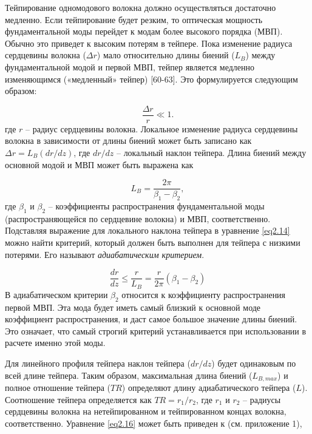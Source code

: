 Тейпирование одномодового волокна должно осуществляться достаточно медленно. Если тейпирование будет резким, то оптическая мощность фундаментальной моды перейдет к модам более высокого порядка (МВП). Обычно это приведет к высоким потерям в тейпере. Пока изменение радиуса сердцевины волокна ($\Delta r$) мало относительно длины биений ($L_B$) между фундаментальной модой и первой МВП, тейпер является медленно изменяющимся («медленный» тейпер) [60-63]. Это формулируется следующим образом:

\begin{equation}\label{eq2.14}
  \frac{\Delta r}{r} \ll 1.
\end{equation}
где $r$ -- радиус сердцевины волокна. Локальное изменение радиуса сердцевины волокна в зависимости от длины биений может быть записано как $\Delta r=L_B (dr/dz)$,  где $dr/dz$ -- локальный наклон тейпера. Длина биений между основной модой и МВП может быть выражена как

\begin{equation}\label{eq2.15}
  L_B=\frac{2\pi}{\beta_1-\beta_2},
\end{equation}
где $\beta_1$ и $\beta_2$ -- коэффициенты распространения фундаментальной моды (распространяющейся по сердцевине волокна) и МВП, соответственно. Подставляя выражение для локального наклона тейпера в уравнение \eqref{eq2.14} можно найти критерий, который должен быть выполнен для тейпера с низкими потерями. Его называют \textit{адиабатическим критерием}.

\begin{equation}\label{eq2.16}
  \frac{dr}{dz}\le\frac{r}{L_B}=\frac{r}{2\pi}(\beta_1-\beta_2)
\end{equation}
В адиабатическом критерии $\beta_2$ относится к коэффициенту распространения первой МВП. Эта мода будет иметь самый близкий к основной моде коэффициент распространения, и даст самое большое значение длины биений. Это означает, что самый строгий критерий устанавливается при использовании в расчете именно этой моды.

Для линейного профиля тейпера наклон тейпера ($dr/dz$) будет одинаковым по всей длине тейпера. Таким образом, максимальная длина биений ($L_{B, max}$) и полное отношение тейпера ($TR$) определяют длину адиабатического тейпера ($L$). Соотношение тейпера определяется как $TR = r_1/r_2$, где $r_1$ и $r_2$ -- радиусы сердцевины волокна на нетейпированном и тейпированном концах волокна,
соответственно. Уравнение \eqref{eq2.16} может быть приведен к (см. приложение 1),

